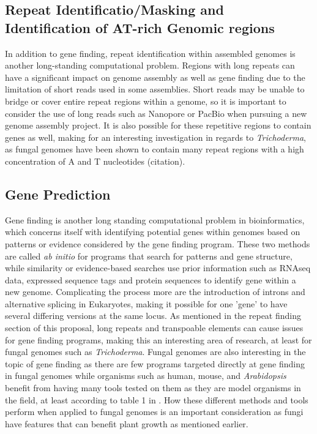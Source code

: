 \documentclass[12pt]{article}
\begin{document}
\subsection{Repeat Identificatio/Masking and Identification of AT-rich Genomic regions}
In addition to gene finding, repeat identification within assembled
genomes is another long-standing computational problem. Regions with
long repeats can have a significant impact on genome assembly as well
as gene finding due to the limitation of short reads used in some
assemblies\cite{Repeats}. Short reads may be unable to bridge or cover
entire repeat regions within a genome, so it is important to consider
the use of long reads such as Nanopore or PacBio when pursuing a new
genome assembly project. It is also possible for these repetitive
regions to contain genes as well, making for an interesting
investigation in regards to \textit{Trichoderma}, as fungal genomes
have been shown to contain many repeat regions with a high
concentration of A and T nucleotides (citation).

\subsection{Gene Prediction}
Gene finding is another long standing computational problem in
bioinformatics, which concerns itself with identifying potential genes
within genomes based on patterns or evidence considered by the gene
finding program. These two methods are called \textit{ab initio} for
programs that search for patterns and gene structure, while similarity
or evidence-based searches use prior information such as RNAseq data,
expressed sequence tags and protein sequences to identify gene within
a new genome\cite{GeneFinding}. Complicating the process more are the
introduction of introns and alternative splicing in Eukaryotes, making
it possible for one 'gene' to have several differing versions at the
same locus. As mentioned in the repeat finding section of this
proposal, long repeats and transpoable elements can cause issues for
gene finding programs, making this an interesting area of research, at
least for fungal genomes such as \textit{Trichoderma}. Fungal genomes
are also interesting in the topic of gene finding as there are few
programs targeted directly at gene finding in fungal genomes while
organisms such as human, mouse, and \textit{Arabidopsis} benefit from
having many tools tested on them as they are model organisms in the
field, at least according to table 1 in \cite{GeneFinding}. How these
different methods and tools perform when applied to fungal genomes is
an important consideration as fungi have features that can benefit
plant growth as mentioned earlier.
\end{document}
